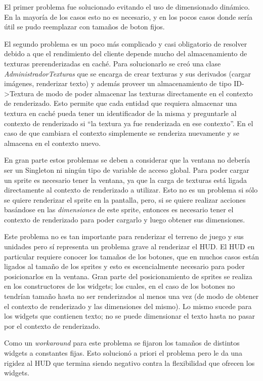 \documentclass[titlepage,a4paper,12pt]{article}
\begin{document}
El primer problema fue solucionado evitando el uso de dimensionado dinámico. En la mayoría de los casos esto no es necesario, y en los pocos casos donde sería útil se pudo reemplazar con tamaños de boton fijos.

El segundo problema es un poco más complicado y casi obligatorio de resolver debido a que el rendimiento del cliente depende mucho del almacenamiento de texturas prerenderizadas en caché. Para solucionarlo se creó una clase \textit{AdministradorTexturas} que se encarga de crear texturas y sus derivados (cargar imágenes, renderizar texto) y además proveer un almacenamiento de tipo ID->Textura de modo de poder almacenar las texturas directamente en el contexto de renderizado. Esto permite que cada entidad que requiera almacenar una textura en caché pueda tener un identificador de la misma y preguntarle al contexto de renderizado si ``la textura ya fue renderizada en ese contexto''. En el caso de que cambiara el contexto simplemente se renderiza nuevamente y se almacena en el contexto nuevo.

En gran parte estos problemas se deben a considerar que la ventana no debería ser un Singleton ni ningún tipo de variable de acceso global. Para poder cargar un sprite es necesario tener la ventana, ya que la carga de texturas está ligada directamente al contexto de renderizado a utilizar. Esto no es un problema si sólo se quiere renderizar el sprite en la pantalla, pero, si se quiere realizar acciones basándose en las \textit{dimensiones} de este sprite, entonces es necesario tener el contexto de renderizado para poder cargarlo y luego obtener sus dimensiones.

Este problema no es tan importante para renderizar el terreno de juego y sus unidades pero sí representa un problema grave al renderizar el HUD. El HUD en particular requiere conocer los tamaños de los botones, que en muchos casos están ligados al tamaño de los sprites y esto es escencialmente necesario para poder posicionarlos en la ventana. Gran parte del posicionamiento de sprites se realiza en los constructores de los widgets; los cuales, en el caso de los botones no tendrían tamaño hasta no ser renderizados al menos una vez (de modo de obtener el contexto de renderizado y las dimensiones del mismo). Lo mismo sucede para los widgets que contienen texto; no se puede dimensionar el texto hasta no pasar por el contexto de renderizado.

Como un \textit{workaround} para este problema se fijaron los tamaños de distintos widgets a constantes fijas. Esto solucionó a priori el problema pero le da una rigidez al HUD que termina siendo negativo contra la flexibilidad que ofrecen los widgets.
\end{document}
